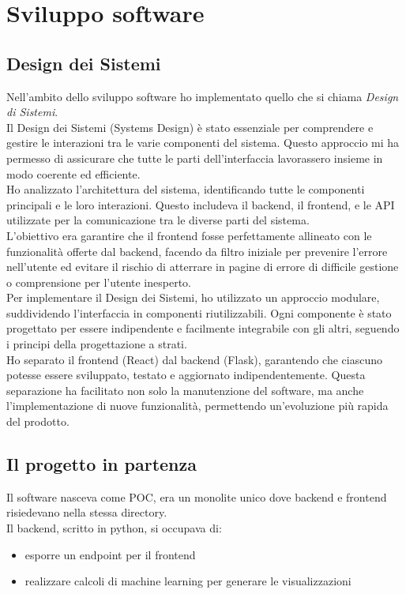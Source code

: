 \chapter{Sviluppo software}
\label{cap:sviluppo-software}

\section{Design dei Sistemi}
Nell'ambito dello sviluppo software ho implementato quello che si chiama \textit{Design di Sistemi}.\\
Il Design dei Sistemi (Systems Design) è stato essenziale per comprendere e gestire le interazioni tra le varie componenti del sistema. Questo approccio mi ha permesso di assicurare che tutte le parti dell'interfaccia lavorassero insieme in modo coerente ed efficiente.\\
Ho analizzato l'architettura del sistema, identificando tutte le componenti principali e le loro interazioni. Questo includeva il backend, il frontend, e le API utilizzate per la comunicazione tra le diverse parti del sistema.\\
L'obiettivo era garantire che il frontend fosse perfettamente allineato con le funzionalità offerte dal backend, facendo da filtro iniziale per prevenire l'errore nell'utente ed evitare il rischio di atterrare in pagine di errore di difficile gestione o comprensione per l'utente inesperto. \\

Per implementare il Design dei Sistemi, ho utilizzato un approccio modulare, suddividendo l'interfaccia in componenti riutilizzabili. Ogni componente è stato progettato per essere indipendente e facilmente integrabile con gli altri, seguendo i principi della progettazione a strati.\\
Ho separato il frontend (React) dal backend (Flask), garantendo che ciascuno potesse essere sviluppato, testato e aggiornato indipendentemente. Questa separazione ha facilitato non solo la manutenzione del software, ma anche l'implementazione di nuove funzionalità, permettendo un'evoluzione più rapida del prodotto.\\


\section{Il progetto in partenza}
Il software nasceva come POC, era un monolite unico dove backend e frontend risiedevano nella stessa directory.\\
Il backend, scritto in python, si occupava di:
\begin{itemize}
    \item esporre un endpoint per il frontend 
    \item realizzare calcoli di machine learning per generare le visualizzazioni 
\end{itemize}

